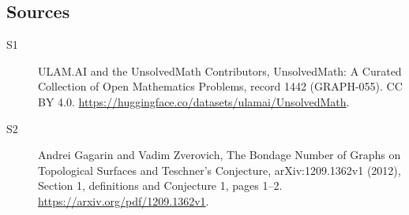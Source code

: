 \documentclass[11pt]{article}
\begin{document}
\subsection{Sources}
\begin{description}
\item[\hypertarget{source:1442:1}{S1}] ULAM.AI and the UnsolvedMath Contributors, UnsolvedMath: A Curated Collection of Open Mathematics Problems, record 1442 (GRAPH-055). CC BY 4.0. \url{https://huggingface.co/datasets/ulamai/UnsolvedMath}.
\item[\hypertarget{source:1442:2}{S2}] Andrei Gagarin and Vadim Zverovich, The Bondage Number of Graphs on Topological Surfaces and Teschner’s Conjecture, arXiv:1209.1362v1 (2012), Section 1, definitions and Conjecture 1, pages 1--2. \url{https://arxiv.org/pdf/1209.1362v1}.
\end{description}
\label{end:1442}
\end{document}
